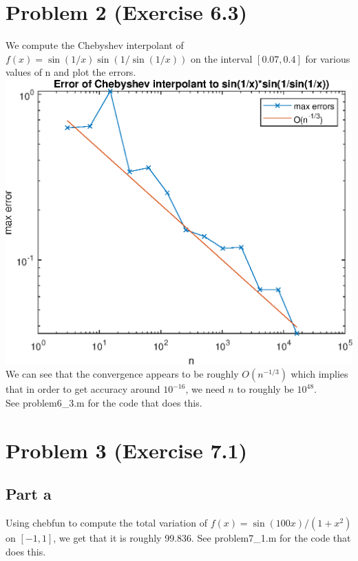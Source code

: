 \documentclass{article}
\begin{document}
\section{Problem 2 (Exercise 6.3)} 
We compute the Chebyshev interpolant of $f(x) = \sin(1/x) \sin(1/ \sin(1/x))$ on the interval $[0.07,0.4]$ for various values of n and plot the errors. \\
\includegraphics[]{prob6-3.eps}\\
We can see that the convergence appears to be roughly $O(n^{-1/3})$ which implies that in order to get accuracy around $10^{-16}$, we need $n$ to roughly be $10^{48}$.\\
See problem6\_3.m for the code that does this.

\section{Problem 3 (Exercise 7.1)}
\subsection{Part a}
Using chebfun to compute the total variation of $f(x) =\sin(100x)/(1 + x^2)$ on $[-1,1]$, we get that it is roughly 99.836. See problem7\_1.m for the code that does this.
\end{document}

